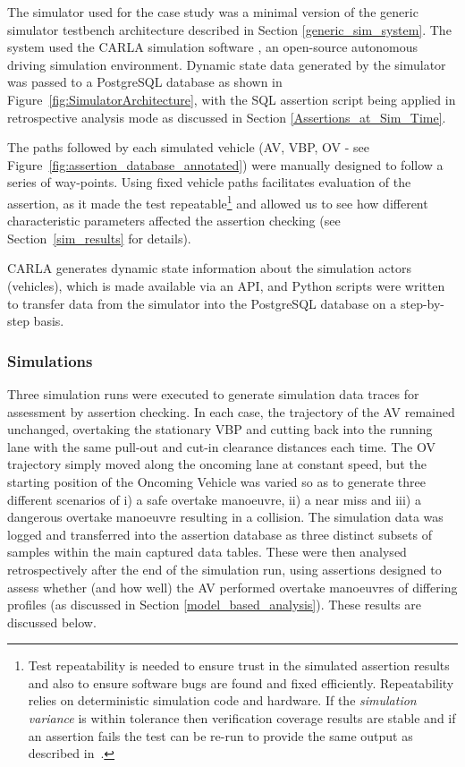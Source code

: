 The simulator used for the case study was a minimal version of the generic simulator testbench architecture described in Section \ref{generic_sim_system}. The system used the CARLA simulation software \cite{CarlaSimulator}, an open-source autonomous driving simulation environment. Dynamic state data generated by the simulator was passed to a PostgreSQL database as shown in Figure~\ref{fig:SimulatorArchitecture}, with the SQL assertion script being applied in retrospective analysis mode as discussed in Section \ref{Assertions_at_Sim_Time}.

The paths followed by each simulated vehicle (AV, VBP, OV - see Figure~\ref{fig:assertion_database_annotated}) were manually designed to follow a series of way-points. Using fixed vehicle paths facilitates evaluation of the assertion, as it made the test repeatable\footnote{Test repeatability is needed to ensure trust in the simulated assertion results and also to ensure software bugs are found and fixed efficiently. Repeatability relies on deterministic simulation code and hardware. If the \emph{simulation variance} is within tolerance then verification coverage results are stable and if an assertion fails the test can be re-run to provide the same output as described in~\cite{chance2021}.} and allowed us to see how different characteristic parameters affected the assertion checking (see Section~\ref{sim_results} for details). 


CARLA generates dynamic state information about the simulation actors (vehicles), which is made available via an API, and Python scripts were written to transfer data from the simulator into the PostgreSQL database on a step-by-step basis.

\subsubsection{Simulations}

Three simulation runs were executed to generate simulation data traces for assessment by assertion checking. In each case, the trajectory of the AV remained unchanged, overtaking the stationary VBP and cutting back into the running lane with the same pull-out and cut-in clearance distances each time. The OV trajectory simply moved along the oncoming lane at constant speed, but the starting position of the Oncoming Vehicle was varied so as to generate three different scenarios of i) a safe overtake manoeuvre, ii) a near miss and iii) a dangerous overtake manoeuvre resulting in a collision. The simulation data was logged and transferred into the assertion database as three distinct subsets of samples within the main captured data tables. These were then analysed retrospectively after the end of the simulation run, using assertions designed to assess whether (and how well) the AV performed overtake manoeuvres of differing profiles (as discussed in Section \ref{model_based_analysis}). These results are discussed below.

